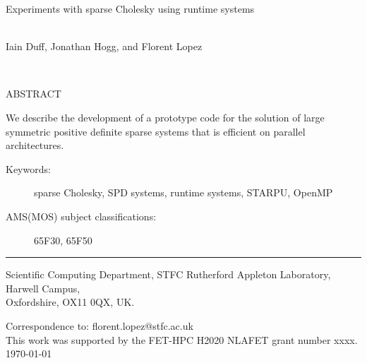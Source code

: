 \documentclass{article}
\newcommand{\stfccovertitle}
{Experiments with sparse Cholesky using runtime systems}
\newcommand{\theabstract}{We describe the development of a prototype code for 
the solution of large symmetric positive definite sparse systems that is
efficient on parallel architectures.
}
\begin{document}
\begin{titlepage}

\vspace*{-0.5cm}

\vspace{1.0 cm}

{\Large \bf
\begin{center}
   \stfccovertitle
\end{center}}

\begin{center}
\mbox{} \\
      Iain Duff, 
      Jonathan Hogg, and Florent Lopez
     
\mbox{} \\
\end{center}

\vspace{1.0cm}


\noindent
{\large ABSTRACT}

\vspace{0.3cm}
\noindent
\theabstract

\vspace{0.6cm}

\begin{description}
\item [Keywords:] sparse Cholesky, SPD systems, runtime systems, STARPU, OpenMP
\item [AMS(MOS) subject classifications:]  65F30, 65F50
\end{description}

\vspace{0.1 cm}

\noindent \rule{15cm}{0.001in}
\vspace{0.1 cm}

\begin{description}

\item Scientific Computing Department, STFC Rutherford Appleton
  Laboratory, Harwell Campus,\\ Oxfordshire, OX11 0QX, UK.
\end{description}
\noindent
Correspondence to: florent.lopez@stfc.ac.uk\\
This work was supported by the FET-HPC H2020 NLAFET grant number xxxx.\\


\vspace{1.1 cm}
\noindent \today

\end{titlepage}
\end{document}
